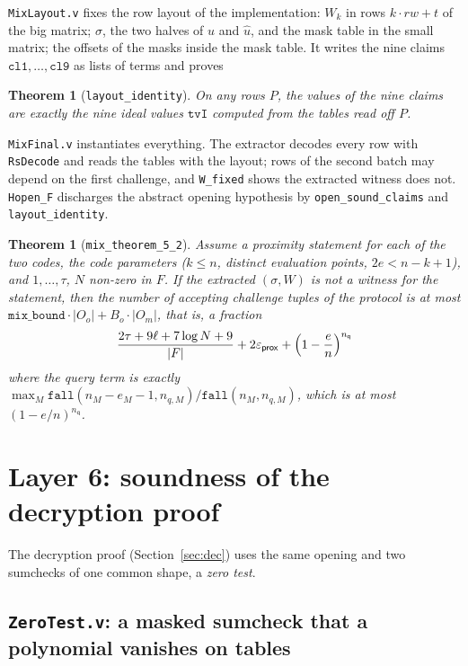 \documentclass[11pt,a4paper]{article}
\newcommand{\epsprox}{\varepsilon_{\mathsf{prox}}}
\newcommand{\nq}{n_{\mathsf{q}}}
\newcommand{\uh}{\hat{u}}
\theoremstyle{definition}
\theoremstyle{plain}
\newtheorem{theorem}[definition]{Theorem}
\begin{document}
\texttt{MixLayout.v} fixes the row layout of the implementation: $W_k$ in rows $k\cdot rw+t$ of the big
matrix; $\sigma$, the two halves of $u$ and $\uh$, and the mask table in the small matrix; the
offsets of the masks inside the mask table. It writes the nine claims $\mathtt{cl1},\dots,\mathtt{cl9}$
as lists of terms and proves
\begin{theorem}[\texttt{layout\_identity}]
On any rows $P$, the values of the nine claims are exactly the nine ideal values $\mathtt{tvI}$ computed
from the tables read off $P$.
\end{theorem}
\texttt{MixFinal.v} instantiates everything. The extractor decodes every row with \texttt{RsDecode}
and reads the tables with the layout; rows of the second batch may depend on the first challenge,
and \texttt{W\_fixed} shows the extracted witness does not. \texttt{Hopen\_F} discharges the abstract
opening hypothesis by \texttt{open\_sound\_claims} and \texttt{layout\_identity}.
\begin{theorem}[\texttt{mix\_theorem\_5\_2}]
Assume a proximity statement for each of the two codes, the code parameters ($k\le n$, distinct
evaluation points, $2e<n-k+1$), and $1,\dots,\tau$, $N$ non-zero in $F$. If the extracted
$(\sigma,W)$ is not a witness for the statement, then the number of accepting challenge tuples of
the protocol is at most $\mathtt{mix\_bound}\cdot|O_o|+B_o\cdot|O_m|$, that is, a fraction
\[
  \frac{2\tau+9\ell+7\log N+9}{|F|}+2\epsprox+\Bigl(1-\frac en\Bigr)^{\nq}
\]
where the query term is exactly $\max_M\mathtt{fall}(n_M-e_M-1,n_{q,M})/\mathtt{fall}(n_M,n_{q,M})$, which is
at most $(1-e/n)^{\nq}$.
\end{theorem}

\section{Layer 6: soundness of the decryption proof}
\label{sec:fm-dec}

The decryption proof (Section~\ref{sec:dec}) uses the same opening and two sumchecks of one common
shape, a \emph{zero test}.

\subsection{\texttt{ZeroTest.v}: a masked sumcheck that a polynomial vanishes on tables}
\end{document}
